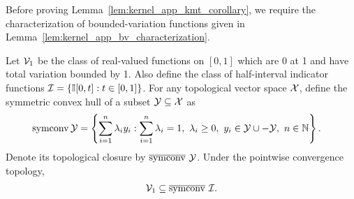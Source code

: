 Before proving Lemma~\ref{lem:kernel_app_kmt_corollary},
we require the characterization
of bounded-variation functions given in
Lemma~\ref{lem:kernel_app_bv_characterization}.

\begin{lemma}
  \label{lem:kernel_app_bv_characterization}

  Let $\mathcal{V}_1$ be
  the class of real-valued functions on $[0,1]$
  which are 0 at 1 and have total variation bounded by 1.
  Also define the class of
  half-interval indicator functions $\mathcal{I} = \{\mathbb{I}[0,t]: t \in [0,1]\}$.
  For any topological vector space $\mathcal{X}$,
  define the symmetric convex hull of a subset $\mathcal{Y} \subseteq \mathcal{X}$ as
  \begin{align*}
    \operatorname{symconv} \mathcal{Y}
    &=
    \left\{
      \sum_{i=1}^n
      \lambda_i
      y_i :
      \sum_{i=1}^n
      \lambda_i
      = 1, \
      \lambda_i
      \geq 0, \
      y_i \in \mathcal{Y} \cup -\mathcal{Y}, \
      n \in \mathbb{N}
    \right\}.
  \end{align*}
  Denote its topological closure by
  $\overline{\operatorname{symconv}} \ \mathcal{Y}$.
  Under the pointwise convergence topology,
  \begin{align*}
    \mathcal{V}_1 \subseteq \overline{\operatorname{symconv}} \ \mathcal{I}.
  \end{align*}

\end{lemma}

